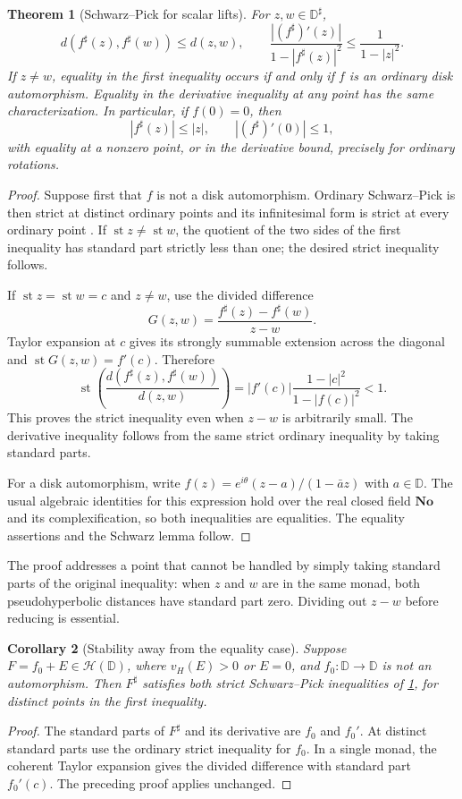 \documentclass[11pt,letterpaper]{article}
\newtheorem{theorem}{Theorem}[section]
\newtheorem{corollary}[theorem]{Corollary}
\theoremstyle{definition}
\theoremstyle{remark}
\newcommand{\No}{\mathbf{No}}
\newcommand{\HH}{\mathcal H}
\newcommand{\DD}{\mathbb D}
\newcommand{\st}{\operatorname{st}}
\newcommand{\sh}{^{\sharp}}
\numberwithin{equation}{section}
\begin{document}
\begin{theorem}[Schwarz--Pick for scalar lifts]\label{thm:SP}
For $z,w\in\DD\sh$,
\begin{equation}\label{eq:SP}
 d(f\sh(z),f\sh(w))\le d(z,w),\qquad
 \frac{|(f\sh)'(z)|}{1-|f\sh(z)|^2}
 \le\frac1{1-|z|^2}.
\end{equation}
If $z\ne w$, equality in the first inequality occurs if and only if $f$ is an ordinary disk automorphism. Equality in the derivative inequality at any point has the same characterization. In particular, if $f(0)=0$, then
\[
 |f\sh(z)|\le |z|,\qquad |(f\sh)'(0)|\le1,
\]
with equality at a nonzero point, or in the derivative bound, precisely for ordinary rotations.
\end{theorem}
\begin{proof}
Suppose first that $f$ is not a disk automorphism. Ordinary Schwarz--Pick is then strict at distinct ordinary points and its infinitesimal form is strict at every ordinary point \cite{Ahlfors}. If $\st z\ne\st w$, the quotient of the two sides of the first inequality has standard part strictly less than one; the desired strict inequality follows.

If $\st z=\st w=c$ and $z\ne w$, use the divided difference
\[
 G(z,w)=\frac{f\sh(z)-f\sh(w)}{z-w}.
\]
Taylor expansion at $c$ gives its strongly summable extension across the diagonal and $\st G(z,w)=f'(c)$. Therefore
\[
 \st\left(
 \frac{d(f\sh(z),f\sh(w))}{d(z,w)}
 \right)
 =|f'(c)|\frac{1-|c|^2}{1-|f(c)|^2}<1.
\]
This proves the strict inequality even when $z-w$ is arbitrarily small. The derivative inequality follows from the same strict ordinary inequality by taking standard parts.

For a disk automorphism, write $f(z)=e^{i\theta}(z-a)/(1-\bar a z)$ with $a\in\DD$. The usual algebraic identities for this expression hold over the real closed field $\No$ and its complexification, so both inequalities are equalities. The equality assertions and the Schwarz lemma follow.
\end{proof}
The proof addresses a point that cannot be handled by simply taking standard parts of the original inequality: when $z$ and $w$ are in the same monad, both pseudohyperbolic distances have standard part zero. Dividing out $z-w$ before reducing is essential.

\begin{corollary}[Stability away from the equality case]\label{cor:SPperturb}
Suppose $F=f_0+E\in\HH(\DD)$, where $v_H(E)>0$ or $E=0$, and $f_0:\DD\to\DD$ is not an automorphism. Then $F\sh$ satisfies both strict Schwarz--Pick inequalities of \cref{thm:SP}, for distinct points in the first inequality.
\end{corollary}
\begin{proof}
The standard parts of $F\sh$ and its derivative are $f_0$ and $f_0'$. At distinct standard parts use the ordinary strict inequality for $f_0$. In a single monad, the coherent Taylor expansion gives the divided difference with standard part $f_0'(c)$. The preceding proof applies unchanged.
\end{proof}
\end{document}
